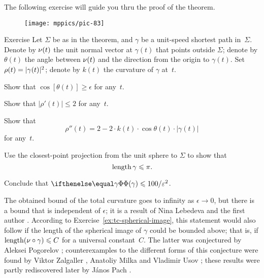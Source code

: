 The following exercise will guide you thru the proof of the theorem. 

\begin{wrapfigure}{r}{48 mm}
\vskip-2mm
\centering
\texttt{[image: mppics/pic-83]}
\vskip-0mm
\end{wrapfigure}

\begin{thm}{Exercise}\label{ex:bound-tc}
Let $\Sigma$ be as in the theorem, and $\gamma$ be a unit-speed shortest path in~$\Sigma$.
Denote by $\nu(t)$ the unit normal vector at $\gamma(t)$ that points outside $\Sigma$;
denote by $\theta(t)$ the angle between $\nu(t)$ and the direction from the origin to $\gamma(t)$.
Set $\rho(t)\z=|\gamma(t)|^2$; denote by $k(t)$ the curvature of $\gamma$ at~$t$.

\begin{subthm}{}
Show that $\cos[\theta(t)]\ge \epsilon$ for any~$t$.
\end{subthm}

\begin{subthm}{}
 Show that $|\rho'(t)|\le 2$ for any~$t$.
\end{subthm}

\begin{subthm}{}
 Show that 
\[\rho''(t)=2-2\cdot k(t)\cdot \cos \theta(t)\cdot |\gamma(t)|\]
for any~$t$.
\end{subthm}

\begin{subthm}{}
 Use the closest-point projection from the unit sphere to $\Sigma$ to show that 
\[\mathop{\rm length}\nolimits \gamma\leqslant \pi.\]
\end{subthm}

\begin{subthm}{}
Conclude that $\tc\gamma\le 100/\epsilon^2$.
\end{subthm}

\end{thm}

The obtained bound of the total curvature goes to infinity as $\epsilon\to 0$,
but there is a bound that is independent of $\epsilon$;
it is a result of Nina Lebedeva and the first author \cite{lebedeva-petrunin}.
According to Exercise~\ref{ex:tc-spherical-image}, this statement would also follow if the length of the spherical image of $\gamma$ could be bounded above; 
that is, if $\mathop{\rm length}\nolimits(\nu\circ\gamma)\leqslant C$ for a universal constant~$C$.
The latter was conjectured by Aleksei Pogorelov \cite{pogorelov};
counterexamples to the different forms of this conjecture were found 
by Viktor Zalgaller \cite{zalgaller},
Anatoliy Milka \cite{milka}
and Vladimir Usov \cite{usov};
these results were partly rediscovered later 
by J\'{a}nos Pach \cite{pach}.
